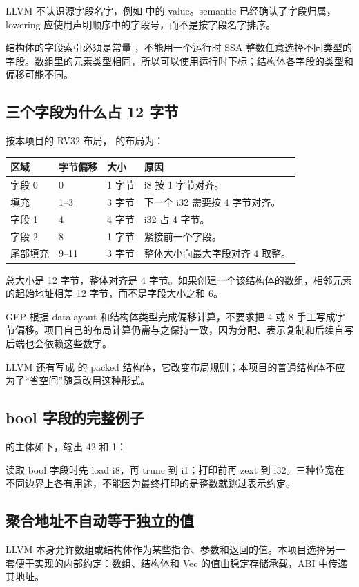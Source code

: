 LLVM 不认识源字段名字，例如  中的 value。semantic 已经确认了字段归属，lowering 应使用声明顺序中的字段号，而不是按字段名字排序。

结构体的字段索引必须是常量 ，不能用一个运行时 SSA 整数任意选择不同类型的字段。数组里的元素类型相同，所以可以使用运行时下标；结构体各字段的类型和偏移可能不同。

\subsection{三个字段为什么占 12 字节}
按本项目的 RV32 布局， 的布局为：

\begin{tabularx}{\linewidth}{@{}p{24mm}p{30mm}p{33mm}Y@{}}
\toprule
区域 & 字节偏移 & 大小 & 原因 \\
\midrule
字段 0 & 0 & 1 字节 & i8 按 1 字节对齐。\\
填充 & 1--3 & 3 字节 & 下一个 i32 需要按 4 字节对齐。\\
字段 1 & 4 & 4 字节 & i32 占 4 字节。\\
字段 2 & 8 & 1 字节 & 紧接前一个字段。\\
尾部填充 & 9--11 & 3 字节 & 整体大小向最大字段对齐 4 取整。\\
\bottomrule
\end{tabularx}

总大小是 12 字节，整体对齐是 4 字节。如果创建一个该结构体的数组，相邻元素的起始地址相差 12 字节，而不是字段大小之和 6。

GEP 根据 datalayout 和结构体类型完成偏移计算，不要求把 4 或 8 手工写成字节偏移。项目自己的布局计算仍需与之保持一致，因为分配、表示复制和后续自写后端也会依赖这些数字。

LLVM 还有写成  的 packed 结构体，它改变布局规则；本项目的普通结构体不应为了“省空间”随意改用这种形式。

\subsection{bool 字段的完整例子}
 的主体如下，输出 42 和 1：

读取 bool 字段时先 load i8，再 trunc 到 i1；打印前再 zext 到 i32。三种位宽在不同边界上各有用途，不能因为最终打印的是整数就跳过表示约定。

\subsection{聚合地址不自动等于独立的值}
LLVM 本身允许数组或结构体作为某些指令、参数和返回的值。本项目选择另一套便于实现的内部约定：数组、结构体和 Vec 的值由稳定存储承载，ABI 中传递其地址。

